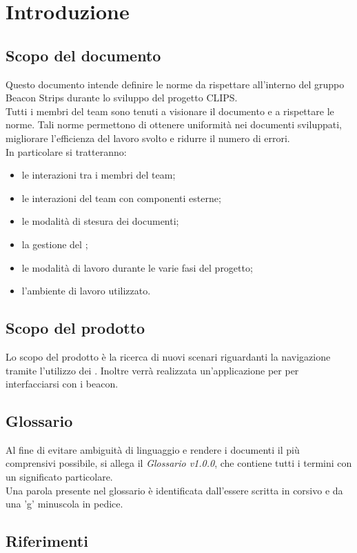 \section{Introduzione}
	\subsection{Scopo del documento}
	Questo documento intende definire le norme da rispettare all'interno del gruppo Beacon Strips durante lo sviluppo del progetto CLIPS. \\
	Tutti i membri del team sono tenuti a visionare il documento e a rispettare le norme. Tali norme permettono di ottenere uniformità nei documenti sviluppati,
	migliorare l'efficienza del lavoro svolto e ridurre il numero di errori. \\
	In particolare si tratteranno:
	\begin{itemize}
		\item le interazioni tra i membri del team;
		\item le interazioni del team con componenti esterne;
		\item le modalità di stesura dei documenti;
		\item la gestione del ;
		\item le modalità di lavoro durante le varie fasi del progetto;
		\item l'ambiente di lavoro utilizzato.
	\end{itemize}
	
	\subsection{Scopo del prodotto}
	Lo scopo del prodotto è la ricerca di nuovi scenari riguardanti la navigazione tramite l'utilizzo dei . Inoltre verrà realizzata un'applicazione per  per interfacciarsi con i beacon.
	\subsection{Glossario}
	Al fine di evitare ambiguità di linguaggio e rendere i documenti il più comprensivi possibile, si allega il \textit {Glossario v1.0.0}, che contiene tutti i termini 
	con un significato particolare. \\
	Una parola presente nel glossario è identificata dall'essere scritta in corsivo e da una 'g'  minuscola in pedice. %
	\subsection{Riferimenti}
	
